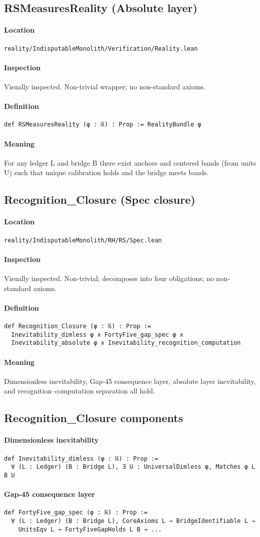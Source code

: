 \documentclass{article}
\newcommand{\FileRef}[1]{\texttt{#1}}
\newcommand{\ModuleHeader}[3]{%
  \subsection{#1}
  \paragraph{Location} \FileRef{#2}\\
  \paragraph{Inspection} #3
}
\begin{document}
\ModuleHeader{RSMeasuresReality (Absolute layer)}{reality/IndisputableMonolith/Verification/Reality.lean}{Visually inspected. Non-trivial wrapper; no non-standard axioms.}
\paragraph{Definition}
\begin{lstlisting}
def RSMeasuresReality (φ : ℝ) : Prop := RealityBundle φ
\end{lstlisting}
\paragraph{Meaning} For any ledger L and bridge B there exist anchors and centered bands (from units U) such that unique calibration holds and the bridge meets bands.

\ModuleHeader{Recognition\_Closure (Spec closure)}{reality/IndisputableMonolith/RH/RS/Spec.lean}{Visually inspected. Non-trivial; decomposes into four obligations; no non-standard axioms.}
\paragraph{Definition}
\begin{lstlisting}
def Recognition_Closure (φ : ℝ) : Prop :=
  Inevitability_dimless φ ∧ FortyFive_gap_spec φ ∧
  Inevitability_absolute φ ∧ Inevitability_recognition_computation
\end{lstlisting}
\paragraph{Meaning} Dimensionless inevitability, Gap‑45 consequence layer, absolute layer inevitability, and recognition–computation separation all hold.

\subsection{Recognition\_Closure components}
\paragraph{Dimensionless inevitability}
\begin{lstlisting}
def Inevitability_dimless (φ : ℝ) : Prop :=
  ∀ (L : Ledger) (B : Bridge L), ∃ U : UniversalDimless φ, Matches φ L B U
\end{lstlisting}

\paragraph{Gap‑45 consequence layer}
\begin{lstlisting}
def FortyFive_gap_spec (φ : ℝ) : Prop :=
  ∀ (L : Ledger) (B : Bridge L), CoreAxioms L → BridgeIdentifiable L →
    UnitsEqv L → FortyFiveGapHolds L B → ...
\end{lstlisting}
\end{document}
